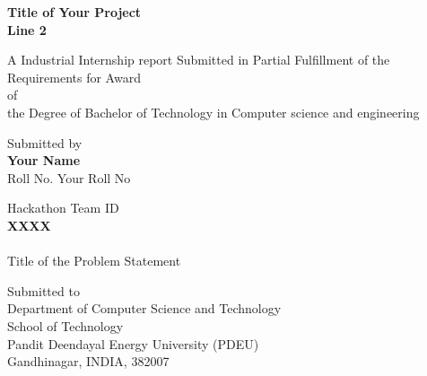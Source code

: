 \documentclass[a4paper,12pt]{book}
\begin{document}
\begin{titlepage}
\noindent
\begin{center}
{\color{black}
{\Huge {\bf Title of Your Project \\ Line 2\\
\vspace{.2cm}
 }}}
\end{center}
\newcommand{\TitleStyle}[1]{{\Large \textbf{#1}}}
\newcommand{\TitleSpace}{\vspace{2pt}}
\vspace{1cm}
\begin{center}
{\color{black}\textrm{A Industrial Internship report Submitted in Partial Fulfillment of the Requirements for Award\\
 of\\
 the Degree of Bachelor of Technology in Computer science and engineering}}
\end{center}
\vspace{0.5cm}
\begin{center}
\end{center}
\vspace{0.5cm}
\begin{center}
{\color{black}\textrm{Submitted by \\
        {\bf Your Name} \\
        Roll No. Your Roll No}}
\end{center}
\vspace{0.3cm}
\begin{center}
{\color{black}\textrm{Hackathon Team ID\\
        {\bf XXXX } \\
          \\
          Title of the Problem Statement\\}}
\end{center}
\vspace{\fill}
\vspace{0.2cm}
\begin{center}
{\color{black}\textrm{Submitted to \\ Department of Computer Science and Technology\\
School of Technology \\
Pandit Deendayal Energy University (PDEU)\\Gandhinagar, INDIA, 382007}
} 
\end{center}

\end{titlepage}
\end{document}
